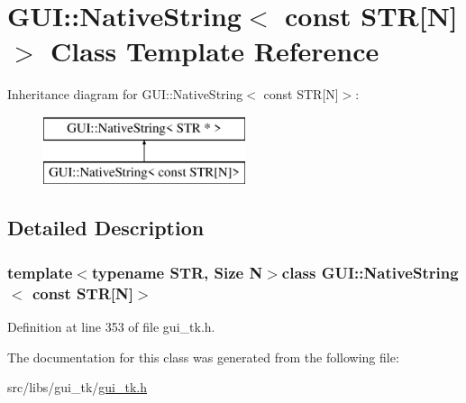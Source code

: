 \hypertarget{classGUI_1_1NativeString_3_01const_01STR[N]_4}{\section{G\-U\-I\-:\-:Native\-String$<$ const S\-T\-R\mbox{[}N\mbox{]}$>$ Class Template Reference}
\label{classGUI_1_1NativeString_3_01const_01STR[N]_4}
}
Inheritance diagram for G\-U\-I\-:\-:Native\-String$<$ const S\-T\-R\mbox{[}N\mbox{]}$>$\-:\begin{figure}[H]
\begin{center}
\leavevmode
\includegraphics[height=2.000000cm]{classGUI_1_1NativeString_3_01const_01STR[N]_4}
\end{center}
\end{figure}


\subsection{Detailed Description}
\subsubsection*{template$<$typename S\-T\-R, Size N$>$class G\-U\-I\-::\-Native\-String$<$ const S\-T\-R\mbox{[}\-N\mbox{]}$>$}



Definition at line 353 of file gui\-\_\-tk.\-h.



The documentation for this class was generated from the following file\-:\begin{DoxyCompactItemize}
\item 
src/libs/gui\-\_\-tk/\hyperlink{gui__tk_8h}{gui\-\_\-tk.\-h}\end{DoxyCompactItemize}
